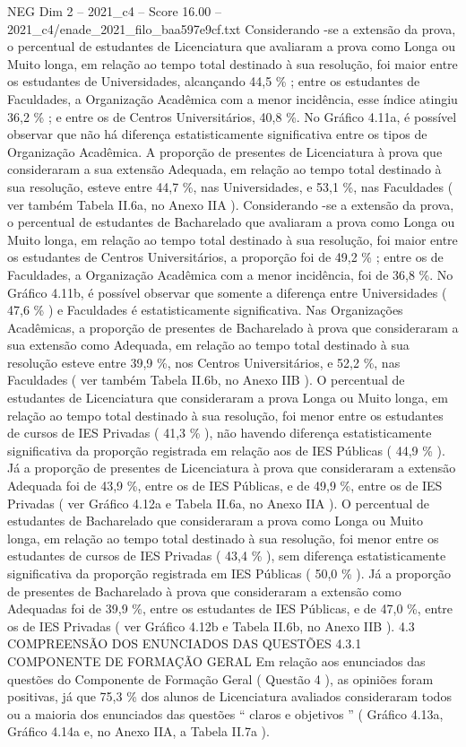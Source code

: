 \begin{textsample}{NEG Dim 2 – 2021\_c4 – Score 16.00 – 2021\_c4/enade\_2021\_filo\_baa597e9cf.txt}
Considerando -se a extensão da prova, o percentual de estudantes de Licenciatura que avaliaram a prova como Longa ou Muito longa, em relação ao tempo total destinado à sua resolução, foi maior entre os estudantes de Universidades, alcançando 44,5 \% ; entre os estudantes de Faculdades, a Organização Acadêmica com a menor incidência, esse índice atingiu 36,2 \% ; e entre os de Centros Universitários, 40,8 \%.
No Gráfico 4.11a, é possível observar que não há diferença estatisticamente significativa entre os tipos de Organização Acadêmica.
A proporção de presentes de Licenciatura à prova que consideraram a sua extensão Adequada, em relação ao tempo total destinado à sua resolução, esteve entre 44,7 \%, nas Universidades, e 53,1 \%, nas Faculdades ( ver também Tabela II.6a, no Anexo IIA ).
Considerando -se a extensão da prova, o percentual de estudantes de Bacharelado que avaliaram a prova como Longa ou Muito longa, em relação ao tempo total destinado à sua resolução, foi maior entre os estudantes de Centros Universitários, a proporção foi de 49,2 \% ; entre os de Faculdades, a Organização Acadêmica com a menor incidência, foi de 36,8 \%.
No Gráfico 4.11b, é possível observar que somente a diferença entre Universidades ( 47,6 \% ) e Faculdades é estatisticamente significativa.
Nas Organizações Acadêmicas, a proporção de presentes de Bacharelado à prova que consideraram a sua extensão como Adequada, em relação ao tempo total destinado à sua resolução esteve entre 39,9 \%, nos Centros Universitários, e 52,2 \%, nas Faculdades ( ver também Tabela II.6b, no Anexo IIB ).
O percentual de estudantes de Licenciatura que consideraram a prova Longa ou Muito longa, em relação ao tempo total destinado à sua resolução, foi menor entre os estudantes de cursos de IES Privadas ( 41,3 \% ), não havendo diferença estatisticamente significativa da proporção registrada em relação aos de IES Públicas ( 44,9 \% ).
Já a proporção de presentes de Licenciatura à prova que consideraram a extensão Adequada foi de 43,9 \%, entre os de IES Públicas, e de 49,9 \%, entre os de IES Privadas ( ver Gráfico 4.12a e Tabela II.6a, no Anexo IIA ).
O percentual de estudantes de Bacharelado que consideraram a prova como Longa ou Muito longa, em relação ao tempo total destinado à sua resolução, foi menor entre os estudantes de cursos de IES Privadas ( 43,4 \% ), sem diferença estatisticamente significativa da proporção registrada em IES Públicas ( 50,0 \% ).
Já a proporção de presentes de Bacharelado à prova que consideraram a extensão como Adequadas foi de 39,9 \%, entre os estudantes de IES Públicas, e de 47,0 \%, entre os de IES Privadas ( ver Gráfico 4.12b e Tabela II.6b, no Anexo IIB ). 4.3 COMPREENSÃO DOS ENUNCIADOS DAS QUESTÕES 4.3.1 COMPONENTE DE FORMAÇÃO GERAL Em relação aos enunciados das questões do Componente de Formação Geral ( Questão 4 ), as opiniões foram positivas, já que 75,3 \% dos alunos de Licenciatura avaliados consideraram todos ou a maioria dos enunciados das questões “ claros e objetivos ” ( Gráfico 4.13a, Gráfico 4.14a e, no Anexo IIA, a Tabela II.7a ).

\end{textsample}
